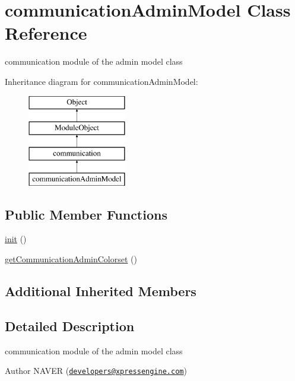 \hypertarget{classcommunicationAdminModel}{\section{communication\+Admin\+Model Class Reference}
\label{classcommunicationAdminModel}
}


communication module of the admin model class  


Inheritance diagram for communication\+Admin\+Model\+:\begin{figure}[H]
\begin{center}
\leavevmode
\includegraphics[height=4.000000cm]{classcommunicationAdminModel}
\end{center}
\end{figure}
\subsection*{Public Member Functions}
\begin{DoxyCompactItemize}
\item 
\hyperlink{classcommunicationAdminModel_a4e1331e1b2ae7131c7466d3eaf1f86f0}{init} ()
\item 
\hyperlink{classcommunicationAdminModel_ade2f9d20f5902304d38999095261c827}{get\+Communication\+Admin\+Colorset} ()
\end{DoxyCompactItemize}
\subsection*{Additional Inherited Members}


\subsection{Detailed Description}
communication module of the admin model class 

\begin{DoxyAuthor}{Author}
N\+A\+V\+E\+R (\href{mailto:developers@xpressengine.com}{\tt developers@xpressengine.\+com}) 
\end{DoxyAuthor}


